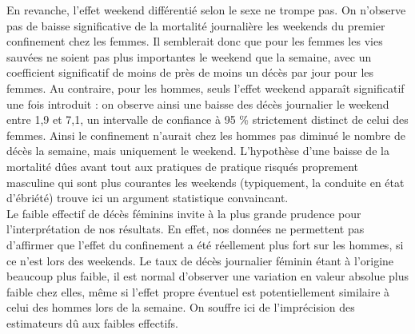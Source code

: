 \documentclass[titlepage]{article}
\begin{document}
En revanche, l'effet weekend différentié selon le sexe ne trompe pas. On n'observe pas de baisse significative de la mortalité journalière les weekends du premier confinement chez les femmes. Il semblerait donc que pour les femmes les vies sauvées ne soient pas plus importantes le weekend que la semaine, avec un coefficient significatif de moins de près de moins un décès par jour pour les femmes. Au contraire, pour les hommes, seuls l'effet weekend apparaît significatif une fois introduit : on observe ainsi une baisse des décès journalier le weekend entre 1,9 et 7,1, un intervalle de confiance à 95 \% strictement distinct de celui des femmes. Ainsi le confinement n'aurait chez les hommes pas diminué le nombre de décès la semaine, mais uniquement le weekend. L'hypothèse d'une baisse de la mortalité dûes avant tout aux pratiques de pratique risqués proprement masculine qui sont plus courantes les weekends (typiquement, la conduite en état d'ébriété) trouve ici un argument statistique convaincant.  \\

Le faible effectif de décès féminins invite à la plus grande prudence pour l'interprétation de nos résultats. En effet, nos données ne permettent pas d’affirmer que l’effet du confinement a été réellement plus fort sur les hommes, si ce n’est lors des weekends. Le taux de décès journalier féminin étant à l’origine beaucoup plus faible, il est normal d’observer une variation en valeur absolue plus faible chez elles, même si l’effet propre éventuel est potentiellement similaire à celui des hommes lors de la semaine. On souffre ici de l’imprécision des estimateurs dû aux faibles effectifs.
\end{document}
